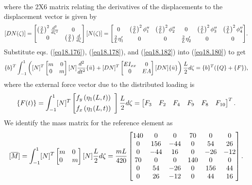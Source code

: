 \documentclass{AeroStructure-ERJohnson}
\begin{document}
where the 2X6 matrix relating the derivatives of the displacements to the displacement vector is given by
\begin{align}\label{eq18.183}
[D N(\zeta)]=
\left[\begin{array}{@{}cc@{}}\left(\frac{2}{L}\right)^{2} \frac{d^{2}}{d \zeta^{2}} & 0 \\0 & \left(\frac{2}{L}\right) \frac{d}{d \zeta}\end{array}\right][N(\zeta)]=
\left[\begin{array}{@{}cccccc@{}}
0 & \left(\frac{2}{L}\right)^2\phi_{1}^{\prime\prime} & \left(\frac{2}{L}\right)^2\phi_{2}^{\prime\prime} & 0 &
\left(\frac{2}{L}\right)^2\phi_{3}^{\prime\prime} & \left(\frac{2}{L}\right)^2\phi_{4}^{\prime\prime}\\[4pt]
\frac{2}{L} \eta_{1}^{\prime} & 0 & 0 & \frac{2}{L} \eta_{2}^{\prime} & 0 & 0
\end{array}\right]\!.
\end{align}
Substitute eqs. (\ref{eq18.176}), (\ref{eq18.178}), and (\ref{eq18.182}) into (\ref{eq18.180}) to get
\begin{align}\label{eq18.184}
\{b\}^{T} \int_{-1}^{1}\left([N]^{T}\left[\begin{array}{@{}cc@{}}m & 0 \\0 & m\end{array}\right][N] \frac{d^{2}}{d t^{2}}\{\bar{u}\}+[D N]^{T}\left[\begin{array}{@{}cc@{}}E I_{x x} & 0 \\0 & E A\end{array}\right][D N]\{\bar{u}\}\right) \frac{L}{2} d \zeta=\{b\}^{T}(\{Q\}+\{F\}),
\end{align}
where the external force vector due to the distributed loading is
\begin{align}\label{eq18.185}
\{F(t)\}=\int_{-1}^{1}[N]^{T}\left[\begin{array}{@{}ll@{}}f_{y}\left(\eta_{1}(L, t)\right) \\[4pt] f_{x}\left(\eta_{1}(L, t)\right)\end{array}\right] \frac{L}{2} d \zeta=\left[\begin{array}{@{}llllll@{}}F_{3} & F_{2} & F_{4} & F_{9} & F_{8} & F_{10}\end{array}\right]^{T}.
\end{align}
We identify the mass matrix for the reference element as
\begin{align}\label{eq18.186}
[\overline{M}]=\int_{-1}^{1}[N]^{T}\left[\begin{array}{@{}ll@{}}m & 0 \\0 & m\end{array}\right][N] \frac{L}{2} d \zeta=\frac{m L}{420}\left[\begin{array}{@{}cccccc@{}}140 & 0 & 0 & 70 & 0 & 0 \\0 & 156 & -44 & 0 & 54 & 26 \\0 & -44 & 16 & 0 & -26 & -12 \\70 & 0 & 0 & 140 & 0 & 0 \\0 & 54 & -26 & 0 & 156 & 44 \\0 & 26 & -12 & 0 & 44 & 16\end{array}\right].
\end{align}
\end{document}
